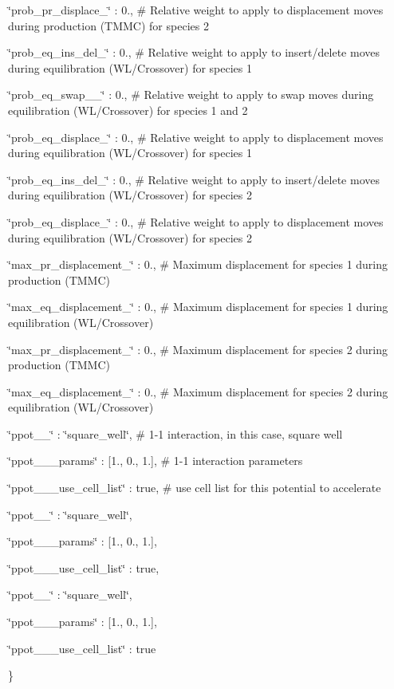 \char`\"{}prob\-\_\-pr\-\_\-displace\-\_\char`\"{} \-: 0., \# Relative weight to apply to displacement moves during production (T\-M\-M\-C) for species 2

\char`\"{}prob\-\_\-eq\-\_\-ins\-\_\-del\-\_\char`\"{} \-: 0., \# Relative weight to apply to insert/delete moves during equilibration (W\-L/\-Crossover) for species 1

\char`\"{}prob\-\_\-eq\-\_\-swap\-\_\-\_\char`\"{} \-: 0., \# Relative weight to apply to swap moves during equilibration (W\-L/\-Crossover) for species 1 and 2

\char`\"{}prob\-\_\-eq\-\_\-displace\-\_\char`\"{} \-: 0., \# Relative weight to apply to displacement moves during equilibration (W\-L/\-Crossover) for species 1

\char`\"{}prob\-\_\-eq\-\_\-ins\-\_\-del\-\_\char`\"{} \-: 0., \# Relative weight to apply to insert/delete moves during equilibration (W\-L/\-Crossover) for species 2

\char`\"{}prob\-\_\-eq\-\_\-displace\-\_\char`\"{} \-: 0., \# Relative weight to apply to displacement moves during equilibration (W\-L/\-Crossover) for species 2

\char`\"{}max\-\_\-pr\-\_\-displacement\-\_\char`\"{} \-: 0., \# Maximum displacement for species 1 during production (T\-M\-M\-C)

\char`\"{}max\-\_\-eq\-\_\-displacement\-\_\char`\"{} \-: 0., \# Maximum displacement for species 1 during equilibration (W\-L/\-Crossover)

\char`\"{}max\-\_\-pr\-\_\-displacement\-\_\char`\"{} \-: 0., \# Maximum displacement for species 2 during production (T\-M\-M\-C)

\char`\"{}max\-\_\-eq\-\_\-displacement\-\_\char`\"{} \-: 0., \# Maximum displacement for species 2 during equilibration (W\-L/\-Crossover)

\char`\"{}ppot\-\_\-\_\char`\"{} \-: \char`\"{}square\-\_\-well\char`\"{}, \# 1-\/1 interaction, in this case, square well

\char`\"{}ppot\-\_\-\_\-\_\-params\char`\"{} \-: \mbox{[}1., 0., 1.\mbox{]}, \# 1-\/1 interaction parameters

\char`\"{}ppot\-\_\-\_\-\_\-use\-\_\-cell\-\_\-list\char`\"{} \-: true, \# use cell list for this potential to accelerate

\char`\"{}ppot\-\_\-\_\char`\"{} \-: \char`\"{}square\-\_\-well\char`\"{},

\char`\"{}ppot\-\_\-\_\-\_\-params\char`\"{} \-: \mbox{[}1., 0., 1.\mbox{]},

\char`\"{}ppot\-\_\-\_\-\_\-use\-\_\-cell\-\_\-list\char`\"{} \-: true,

\char`\"{}ppot\-\_\-\_\char`\"{} \-: \char`\"{}square\-\_\-well\char`\"{},

\char`\"{}ppot\-\_\-\_\-\_\-params\char`\"{} \-: \mbox{[}1., 0., 1.\mbox{]},

\char`\"{}ppot\-\_\-\_\-\_\-use\-\_\-cell\-\_\-list\char`\"{} \-: true

\} 